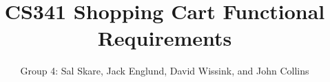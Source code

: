 \documentclass[10pt,letter]{article}
\begin{document}

\title{CS341 Shopping Cart Functional Requirements}

\author{Group 4: Sal Skare, Jack Englund, David Wissink, and John Collins}

\maketitle 
\end{document}
